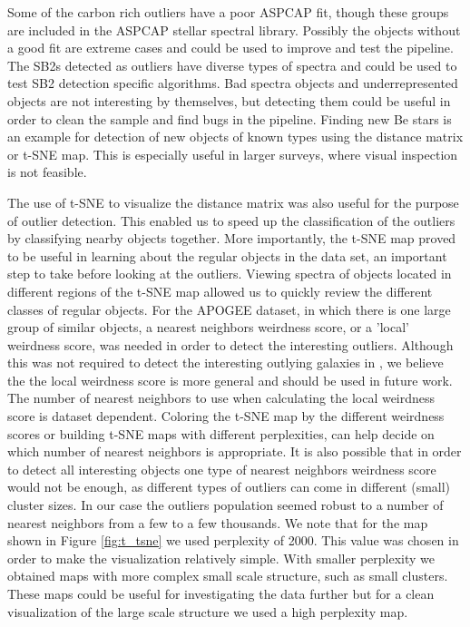 \documentclass[fleqn,usenatbib]{mnras}
\begin{document}
Some of the carbon rich outliers have a poor ASPCAP fit, though these groups are included in the ASPCAP stellar spectral library. Possibly the objects without a good fit are extreme cases and could be used to improve and test the pipeline. 
The SB2s detected as outliers have diverse types of spectra and could be used to test SB2 detection specific algorithms. Bad spectra objects and underrepresented objects are not interesting by themselves, but detecting them could be useful in order to clean the sample and find bugs in the pipeline. Finding new Be stars is an example for detection of new objects of known types using the distance matrix or t-SNE map. This is especially useful in larger surveys, where visual inspection is not feasible.

The use of t-SNE to visualize the distance matrix was also useful for the purpose of outlier detection.  This enabled us to speed up the classification of the outliers by classifying nearby objects together. More importantly, the t-SNE map proved to be useful in learning about the regular objects in the data set, an important step to take before looking at the outliers. Viewing spectra of objects located in different regions of the t-SNE map allowed us to quickly review the different classes of regular objects. For the APOGEE dataset, in which there is one large group of similar objects, a nearest neighbors weirdness score, or a 'local' weirdness score, was needed in order to detect the interesting outliers. Although this was not required to detect the interesting outlying galaxies in \citet{baron17a}, we believe the the local weirdness score is more general and should be used in future work. The number of nearest neighbors to use when calculating the local weirdness score is dataset dependent.  Coloring the t-SNE map by the different weirdness scores or building t-SNE maps with different perplexities, can help decide on which number of nearest neighbors is appropriate. It is also possible that in order to detect all interesting objects one type of nearest neighbors weirdness score would not be enough, as different types of outliers can come in different (small) cluster sizes. In our case the outliers population seemed robust to a number of nearest neighbors from a few to a few thousands. We note that for the map shown in Figure \ref{fig:t_tsne} we used perplexity of 2000. This value was chosen in order to make the visualization relatively simple. With smaller perplexity we obtained maps with more complex small scale structure, such as small clusters. These maps could be useful for investigating the data further but for a clean visualization of the large scale structure we used a high perplexity map.
\end{document}
